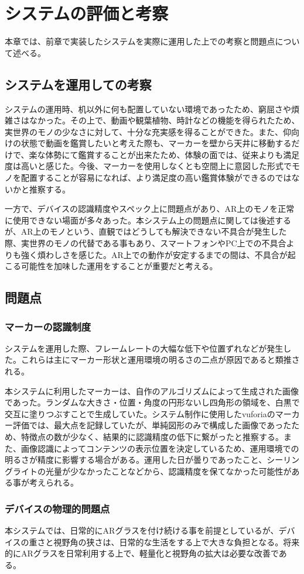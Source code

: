 
\chapter{システムの評価と考察}
\label{chap:systemEvaluation}

本章では、前章で実装したシステムを実際に運用した上での考察と問題点について述べる。

\newpage

\section{システムを運用しての考察}

システムの運用時、机以外に何も配置していない環境であったため、窮屈さや煩雑さはなかった。その上で、動画や観葉植物、時計などの機能を得られたため、実世界のモノの少なさに対して、十分な充実感を得ることができた。また、仰向けの状態で動画を鑑賞したいと考えた際も、マーカーを壁から天井に移動するだけで、楽な体勢にて鑑賞することが出来たため、体験の面では、従来よりも満足度は高いと感じた。今後、マーカーを使用しなくとも空間上に意図した形式でモノを配置することが容易になれば、より満足度の高い鑑賞体験ができるのではないかと推察する。

一方で、デバイスの認識精度やスペック上に問題点があり、AR上のモノを正常に使用できない場面が多々あった。本システム上の問題点に関しては後述するが、AR上のモノという、直観ではどうしても解決できない不具合が発生した際、実世界のモノの代替である事もあり、スマートフォンやPC上での不具合よりも強く煩わしさを感じた。AR上での動作が安定するまでの間は、不具合が起こる可能性を加味した運用をすることが重要だと考える。

\section{問題点}

\subsection{マーカーの認識制度}

システムを運用した際、フレームレートの大幅な低下や位置ずれなどが発生した。これらは主にマーカー形状と運用環境の明るさの二点が原因であると類推される。

本システムに利用したマーカーは、自作のアルゴリズムによって生成された画像であった。ランダムな大きさ・位置・角度の円形ないし四角形の領域を、白黒で交互に塗りつぶすことで生成していた。システム制作に使用したvuforiaのマーカー評価では、最大点を記録していたが、単純図形のみで構成した画像であったため、特徴点の数が少なく、結果的に認識精度の低下に繋がったと推察する。また、画像認識によってコンテンツの表示位置を決定しているため、運用環境での明るさが精度に影響する場合がある。運用した日が曇りであったこと、シーリングライトの光量が少なかったことなどから、認識精度を保てなかった可能性がある事が考えられる。

\subsection{デバイスの物理的問題点}

本システムでは、日常的にARグラスを付け続ける事を前提としているが、デバイスの重さと視野角の狭さは、日常的な生活をする上で大きな負担となる。将来的にARグラスを日常利用する上で、軽量化と視野角の拡大は必要な改善である。
